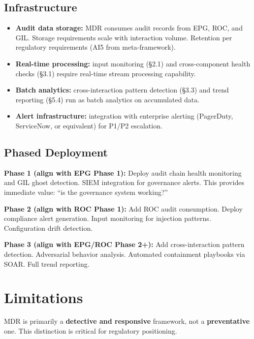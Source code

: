 \subsection{Infrastructure}


\begin{itemize}
  \item \textbf{Audit data storage:} MDR consumes audit records from EPG, ROC, and GIL. Storage requirements scale with interaction volume. Retention per regulatory requirements (AI5 from meta-framework).
  \item \textbf{Real-time processing:} input monitoring (\S{}2.1) and cross-component health checks (\S{}3.1) require real-time stream processing capability.
  \item \textbf{Batch analytics:} cross-interaction pattern detection (\S{}3.3) and trend reporting (\S{}5.4) run as batch analytics on accumulated data.
  \item \textbf{Alert infrastructure:} integration with enterprise alerting (PagerDuty, ServiceNow, or equivalent) for P1/P2 escalation.
\end{itemize}


\subsection{Phased Deployment}


\textbf{Phase 1 (align with EPG Phase 1):} Deploy audit chain health monitoring and GIL ghost detection. SIEM integration for governance alerts. This provides immediate value: ``is the governance system working?''

\textbf{Phase 2 (align with ROC Phase 1):} Add ROC audit consumption. Deploy compliance alert generation. Input monitoring for injection patterns. Configuration drift detection.

\textbf{Phase 3 (align with EPG/ROC Phase 2+):} Add cross-interaction pattern detection. Adversarial behavior analysis. Automated containment playbooks via SOAR. Full trend reporting.



\section{Limitations}
\label{sec:monitoring-8}


MDR is primarily a \textbf{detective and responsive} framework, not a \textbf{preventative} one. This distinction is critical for regulatory positioning.

